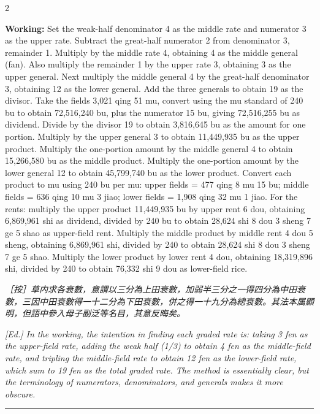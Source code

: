 \documentclass[11pt,a4paper]{article}
\newcommand{\longline}{\noindent\rule{\textwidth}{0.4pt}}
\newcommand{\EdNoteText}[1]{\par\noindent\textit{\color{ednotecolor}［按］#1}\par}
\newcommand{\WorkingEn}[1]{\par\noindent\textbf{Working:} #1\par}
\newcommand{\EdNoteEn}[1]{\par\noindent\textit{\color{ednotecolor}[Ed.] #1}\par}
\begin{document}
\begin{paracol}{2}
\WorkingEn{Set the weak-half denominator 4 as the middle rate and numerator 3 as the upper rate. Subtract the great-half numerator 2 from denominator 3, remainder 1. Multiply by the middle rate 4, obtaining 4 as the middle general (fan). Also multiply the remainder 1 by the upper rate 3, obtaining 3 as the upper general. Next multiply the middle general 4 by the great-half denominator 3, obtaining 12 as the lower general. Add the three generals to obtain 19 as the divisor. Take the fields 3,021 qing 51 mu, convert using the mu standard of 240 bu to obtain 72,516,240 bu, plus the numerator 15 bu, giving 72,516,255 bu as dividend. Divide by the divisor 19 to obtain 3,816,645 bu as the amount for one portion. Multiply by the upper general 3 to obtain 11,449,935 bu as the upper product. Multiply the one-portion amount by the middle general 4 to obtain 15,266,580 bu as the middle product. Multiply the one-portion amount by the lower general 12 to obtain 45,799,740 bu as the lower product. Convert each product to mu using 240 bu per mu: upper fields = 477 qing 8 mu 15 bu; middle fields = 636 qing 10 mu 3 jiao; lower fields = 1,908 qing 32 mu 1 jiao. For the rents: multiply the upper product 11,449,935 bu by upper rent 6 dou, obtaining 6,869,961 shi as dividend, divided by 240 bu to obtain 28,624 shi 8 dou 3 sheng 7 ge 5 shao as upper-field rent. Multiply the middle product by middle rent 4 dou 5 sheng, obtaining 6,869,961 shi, divided by 240 to obtain 28,624 shi 8 dou 3 sheng 7 ge 5 shao. Multiply the lower product by lower rent 4 dou, obtaining 18,319,896 shi, divided by 240 to obtain 76,332 shi 9 dou as lower-field rice.}
\switchcolumn*

\EdNoteText{草内求各衰數，意謂以三分為上田衰數，加弱半三分之一得四分為中田衰數，三因中田衰數得一十二分為下田衰數，併之得一十九分為總衰數。其法本属顯明，但語中參入母子副泛等名目，其意反晦矣。}
\switchcolumn
\EdNoteEn{In the working, the intention in finding each graded rate is: taking 3 fen as the upper-field rate, adding the weak half (1/3) to obtain 4 fen as the middle-field rate, and tripling the middle-field rate to obtain 12 fen as the lower-field rate, which sum to 19 fen as the total graded rate. The method is essentially clear, but the terminology of numerators, denominators, and generals makes it more obscure.}

\end{paracol}

\longline
\end{document}
